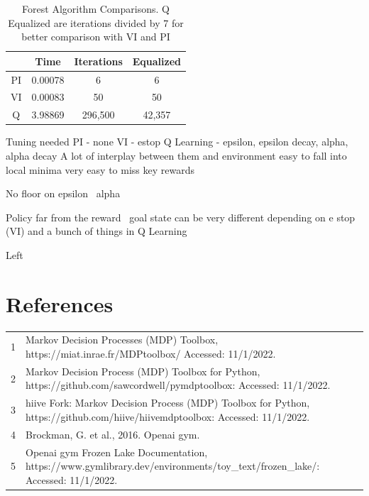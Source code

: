 \documentclass[letterpaper]{article} %
\begin{document}
\begin{table}[!htb]
	\begin{center}
		\begin{tabular}{| c | c  | c | c |}
			\hline
		 	& Time & Iterations & Equalized\\ 
			\hline
			\hline
			PI & 0.00078  &  6  & 6 \\
 			VI & 0.00083 & 50 & 50 \\  
			Q & 3.98869  & 296,500  & 42,357  \\
			\hline
		\end{tabular}
	\end{center}
	\caption{Forest Algorithm Comparisons.  Q Equalized are iterations divided by 7 for better comparison with VI and PI}
	\label{table:forest_comparisons}
\end{table}


Tuning needed
PI - none
VI - estop
Q Learning - epsilon, epsilon decay, alpha, alpha decay
A lot of interplay between them and environment
easy to fall into local minima
very easy to miss key rewards

No floor on epsilon \ alpha

Policy far from the reward \ goal state can be very different depending on e stop (VI) and a bunch of things in Q Learning


Left 
\section{References}
\begin{tabular}{l p{2.75in}}
\\
1 & Markov Decision Processes (MDP) Toolbox, https://miat.inrae.fr/MDPtoolbox/ Accessed: 11/1/2022.
\\
2 & Markov Decision Process (MDP) Toolbox for Python, https://github.com/sawcordwell/pymdptoolbox: Accessed: 11/1/2022.
\\
3 & hiive Fork: Markov Decision Process (MDP) Toolbox for Python, https://github.com/hiive/hiivemdptoolbox: Accessed: 11/1/2022.
\\
4 & Brockman, G. et al., 2016. Openai gym.
\\
5 & Openai gym Frozen Lake Documentation,  https://www.gymlibrary.dev/environments/toy\_text/frozen\_lake/: Accessed: 11/1/2022.

\end{tabular}
\end{document}
